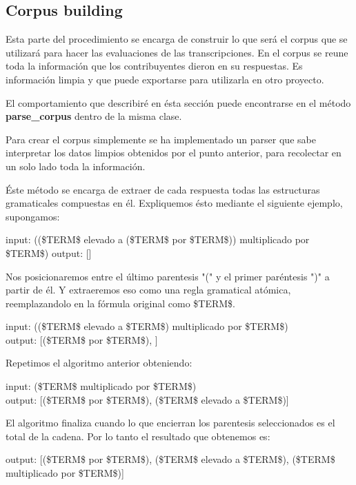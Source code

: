 \subsection{Corpus building}

Esta parte del procedimiento se encarga de construir lo que será el corpus que se utilizará para hacer las evaluaciones de las transcripciones. En el corpus se reune toda la información que los contribuyentes dieron en su respuestas. Es información limpia y que puede exportarse para utilizarla en otro proyecto.

El comportamiento que describiré en ésta sección puede encontrarse en el método \textbf{parse\_corpus} dentro de la misma clase.

Para crear el corpus simplemente se ha implementado un parser que sabe interpretar los datos limpios obtenidos por el punto anterior, para recolectar en un solo lado toda la información.

Éste método se encarga de extraer de cada respuesta todas las estructuras gramaticales compuestas en él. Expliquemos ésto mediante el siguiente ejemplo, supongamos:

\begin{tcolorbox}
input: ((\$TERM\$ elevado a (\$TERM\$ por \$TERM\$)) multiplicado por \$TERM\$)
output: []
\end{tcolorbox}

Nos posicionaremos entre el último parentesis "(" y el primer paréntesis ")" a partir de él. Y extraeremos eso como una regla gramatical atómica, reemplazandolo en la fórmula original como \$TERM\$.

\begin{tcolorbox}
input: ((\$TERM\$ elevado a \$TERM\$) multiplicado por \$TERM\$) \\
output: [(\$TERM\$ por \$TERM\$), ]
\end{tcolorbox}

Repetimos el algoritmo anterior obteniendo:

\begin{tcolorbox}
input: (\$TERM\$ multiplicado por \$TERM\$) \\
output: [(\$TERM\$ por \$TERM\$), (\$TERM\$ elevado a \$TERM\$)]
\end{tcolorbox}

El algoritmo finaliza cuando lo que encierran los parentesis seleccionados es el total de la cadena. Por lo tanto el resultado que obtenemos es:

\begin{tcolorbox}
output: [(\$TERM\$ por \$TERM\$), (\$TERM\$ elevado a \$TERM\$), (\$TERM\$ multiplicado por \$TERM\$)]
\end{tcolorbox}

